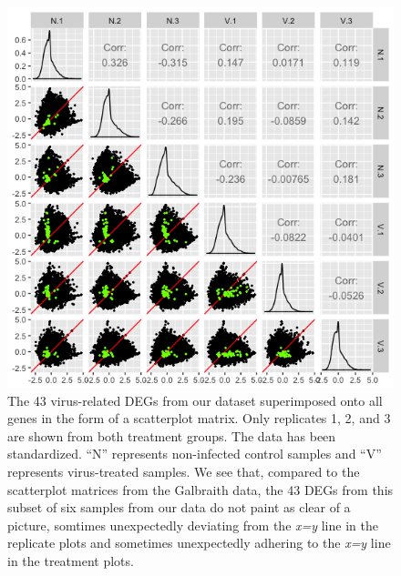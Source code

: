 \documentclass[11pt,a4paper,oldfontcommands,openany]{memoir}
\numberwithin{equation}{section} %
\begin{document}
\begin{figure}[H]
\begin{framed}
  \includegraphics[width=\textwidth]{Images/RutterSM1}
\end{framed}
  \caption{The 43 virus-related DEGs from our dataset superimposed onto all genes in the form of a scatterplot matrix. Only replicates 1, 2, and 3 are shown from both treatment groups. The data has been standardized. ``N'' represents non-infected control samples and ``V'' represents virus-treated samples. We see that, compared to the scatterplot matrices from the Galbraith data, the 43 DEGs from this subset of six samples from our data do not paint as clear of a picture, somtimes unexpectedly deviating from the \textit{x=y} line in the replicate plots and sometimes unexpectedly adhering to the \textit{x=y} line in the treatment plots.}
  \label{fig:RutterSM1}
\end{figure}
\end{document}
